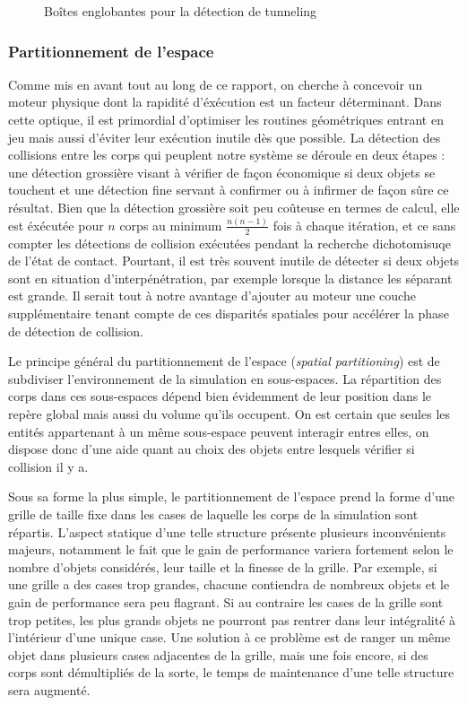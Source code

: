\begin{figure}
  \centering
  
  \caption{Boîtes englobantes pour la détection de tunneling}
  \label{tunneling3}
\end{figure}

\subsubsection{Partitionnement de l'espace}

Comme mis en avant tout au long de ce rapport, on cherche à concevoir
un moteur physique dont la rapidité d'éxécution est un facteur
déterminant. Dans cette optique, il est primordial d'optimiser les
routines géométriques entrant en jeu mais aussi d'éviter leur
exécution inutile dès que possible. La détection des collisions entre
les corps qui peuplent notre système se déroule en deux étapes : une
détection grossière visant à vérifier de façon économique si deux
objets se touchent et une détection fine servant à confirmer ou à
infirmer de façon sûre ce résultat. Bien que la détection grossière
soit peu coûteuse en termes de calcul, elle est éxécutée pour $n$
corps au minimum $\frac{n(n-1)}{2}$ fois à chaque itération, et ce
sans compter les détections de collision exécutées pendant la
recherche dichotomisuqe de l'état de contact. Pourtant, il est très
souvent inutile de détecter si deux objets sont en situation
d'interpénétration, par exemple lorsque la distance les séparant est
grande. Il serait tout à notre avantage d'ajouter au moteur une couche
supplémentaire tenant compte de ces disparités spatiales pour
accélérer la phase de détection de collision.

Le principe général du partitionnement de l'espace (\textit{spatial
  partitioning}) est de subdiviser l'environnement de la simulation en
sous-espaces. La répartition des corps dans ces sous-espaces dépend
bien évidemment de leur position dans le repère global mais aussi du
volume qu'ils occupent. On est certain que seules les entités
appartenant à un même sous-espace peuvent interagir entres elles, on
dispose donc d'une aide quant au choix des objets entre lesquels
vérifier si collision il y a.

Sous sa forme la plus simple, le partitionnement de l'espace prend la
forme d'une grille de taille fixe dans les cases de laquelle les corps
de la simulation sont répartis. L'aspect statique d'une telle
structure présente plusieurs inconvénients majeurs, notamment le fait
que le gain de performance variera fortement selon le nombre d'objets
considérés, leur taille et la finesse de la grille. Par exemple, si
une grille a des cases trop grandes, chacune contiendra de nombreux
objets et le gain de performance sera peu flagrant. Si au contraire
les cases de la grille sont trop petites, les plus grands objets ne
pourront pas rentrer dans leur intégralité à l'intérieur d'une unique
case. Une solution à ce problème est de ranger un même objet dans
plusieurs cases adjacentes de la grille, mais une fois encore, si des
corps sont démultipliés de la sorte, le temps de maintenance d'une
telle structure sera augmenté.

